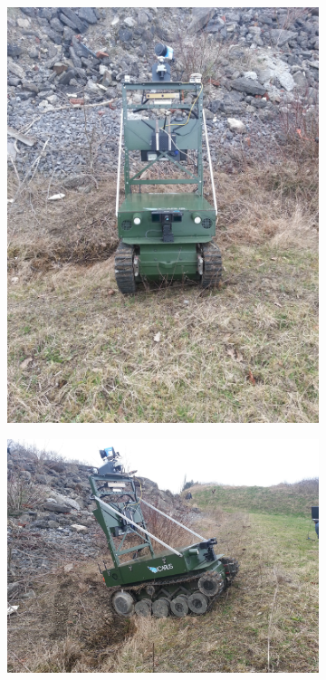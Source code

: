 \documentclass{article}
\begin{document}
\begin{figure}[h]
\centering
 \begin{subfigure} [lt]{0.54\textwidth}
 \centering 
         \includegraphics[scale=0.09,angle=270,origin=c]{ROB-15-0035_fig17a}
 \end{subfigure}
  \begin{subfigure} [rt]{0.44\textwidth}
  \centering 
         \includegraphics[scale=0.06]{ROB-15-0035_fig17b}

\end{subfigure}
\end{figure}
\end{document}
